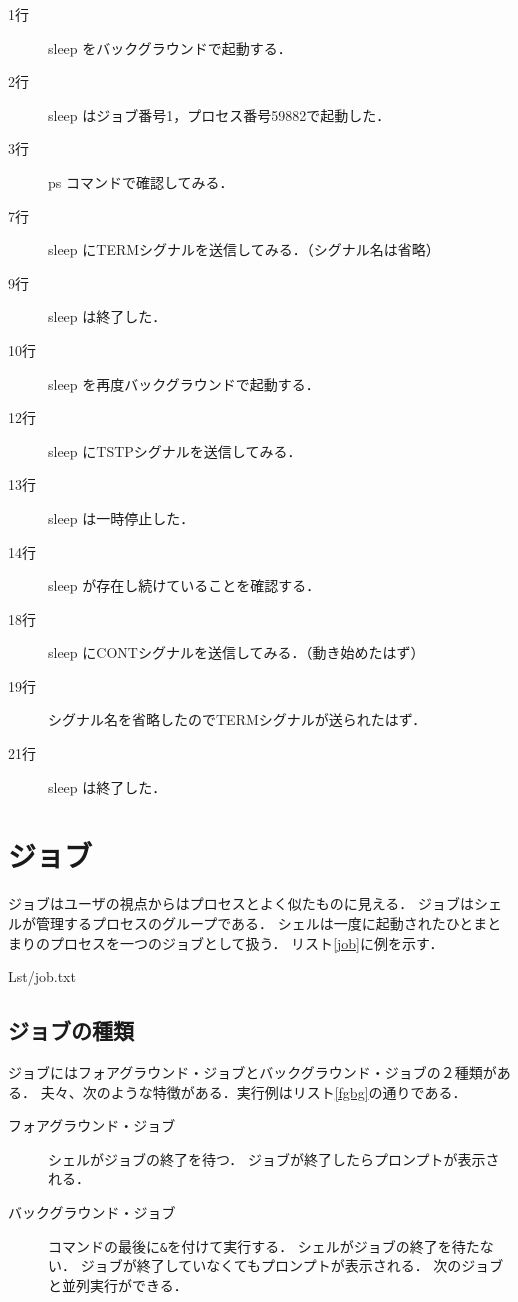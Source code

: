

\begin{description}
\item[1行] sleep をバックグラウンドで起動する．
\item[2行] sleep はジョブ番号1，プロセス番号59882で起動した．
\item[3行] ps コマンドで確認してみる．
\item[7行] sleep にTERMシグナルを送信してみる．（シグナル名は省略）
\item[9行] sleep は終了した．
\item[10行] sleep を再度バックグラウンドで起動する．
\item[12行] sleep にTSTPシグナルを送信してみる．
\item[13行] sleep は一時停止した．
\item[14行] sleep が存在し続けていることを確認する．
\item[18行] sleep にCONTシグナルを送信してみる．（動き始めたはず）
\item[19行] シグナル名を省略したのでTERMシグナルが送られたはず．
\item[21行] sleep は終了した．
\end{description}

\section{ジョブ}
ジョブはユーザの視点からはプロセスとよく似たものに見える．
ジョブはシェルが管理するプロセスのグループである．
シェルは一度に起動されたひとまとまりのプロセスを一つのジョブとして扱う．
リスト\ref{job}に例を示す．


                {Lst/job.txt}

\subsection{ジョブの種類}
ジョブにはフォアグラウンド・ジョブとバックグラウンド・ジョブの２種類がある．
夫々、次のような特徴がある．実行例はリスト\ref{fgbg}の通りである．

\begin{description}
\item[フォアグラウンド・ジョブ]
シェルがジョブの終了を待つ．
ジョブが終了したらプロンプトが表示される．

\item[バックグラウンド・ジョブ]
コマンドの最後に\texttt{\&}を付けて実行する．
シェルがジョブの終了を待たない．
ジョブが終了していなくてもプロンプトが表示される．
次のジョブと並列実行ができる．
\end{description}

